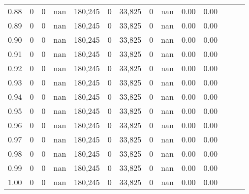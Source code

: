 \begin{tabular}{rrrrrrrrrrrrrr}
0.88 &       0 &      0 &   nan &  180,245 &        0 &  33,825 &       0 &   nan &  0.00 &      0.00 \\
0.89 &       0 &      0 &   nan &  180,245 &        0 &  33,825 &       0 &   nan &  0.00 &      0.00 \\
0.90 &       0 &      0 &   nan &  180,245 &        0 &  33,825 &       0 &   nan &  0.00 &      0.00 \\
0.91 &       0 &      0 &   nan &  180,245 &        0 &  33,825 &       0 &   nan &  0.00 &      0.00 \\
0.92 &       0 &      0 &   nan &  180,245 &        0 &  33,825 &       0 &   nan &  0.00 &      0.00 \\
0.93 &       0 &      0 &   nan &  180,245 &        0 &  33,825 &       0 &   nan &  0.00 &      0.00 \\
0.94 &       0 &      0 &   nan &  180,245 &        0 &  33,825 &       0 &   nan &  0.00 &      0.00 \\
0.95 &       0 &      0 &   nan &  180,245 &        0 &  33,825 &       0 &   nan &  0.00 &      0.00 \\
0.96 &       0 &      0 &   nan &  180,245 &        0 &  33,825 &       0 &   nan &  0.00 &      0.00 \\
0.97 &       0 &      0 &   nan &  180,245 &        0 &  33,825 &       0 &   nan &  0.00 &      0.00 \\
0.98 &       0 &      0 &   nan &  180,245 &        0 &  33,825 &       0 &   nan &  0.00 &      0.00 \\
0.99 &       0 &      0 &   nan &  180,245 &        0 &  33,825 &       0 &   nan &  0.00 &      0.00 \\
1.00 &       0 &      0 &   nan &  180,245 &        0 &  33,825 &       0 &   nan &  0.00 &      0.00 \\
\bottomrule
\end{tabular}
